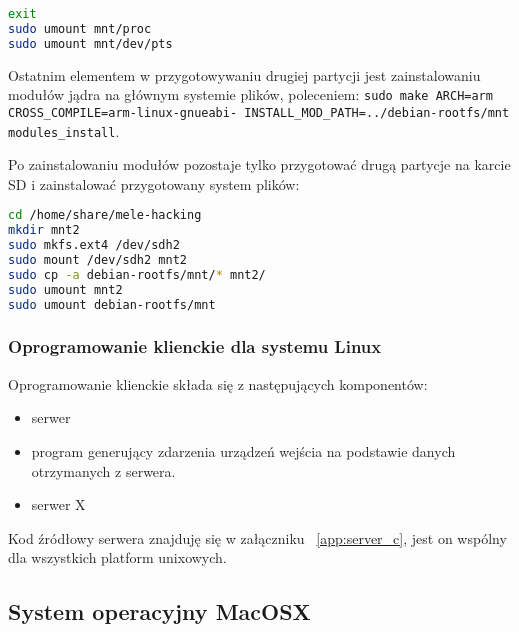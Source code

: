 \begin{lstlisting}[language=bash]
exit
sudo umount mnt/proc
sudo umount mnt/dev/pts
\end{lstlisting}

Ostatnim elementem w przygotowywaniu drugiej partycji jest zainstalowaniu modułów jądra na głównym systemie plików, poleceniem: \lstinline|sudo make ARCH=arm CROSS_COMPILE=arm-linux-gnueabi- INSTALL_MOD_PATH=../debian-rootfs/mnt modules_install|.

Po zainstalowaniu modułów pozostaje tylko przygotować drugą partycje na karcie SD i zainstalować przygotowany system plików:
\begin{lstlisting}[language=bash]
cd /home/share/mele-hacking
mkdir mnt2
sudo mkfs.ext4 /dev/sdh2 
sudo mount /dev/sdh2 mnt2
sudo cp -a debian-rootfs/mnt/* mnt2/
sudo umount mnt2
sudo umount debian-rootfs/mnt
\end{lstlisting}

\subsubsection{Oprogramowanie klienckie dla systemu Linux}

Oprogramowanie klienckie składa się z następujących komponentów:
\begin{itemize}
	\item serwer
	\item program generujący zdarzenia urządzeń wejścia na podstawie danych otrzymanych z serwera.
	\item serwer X
\end{itemize}

Kod źródłowy serwera znajduję się w załączniku ~\ref{app:server_c}, jest on wspólny dla wszystkich platform unixowych.



\subsection{System operacyjny MacOSX}
